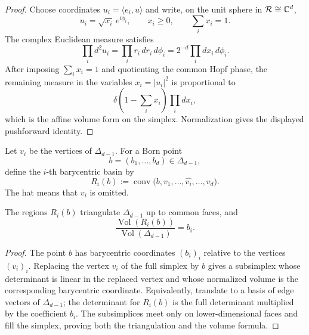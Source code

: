 \documentclass[12pt,a4paper]{article}
\begin{document}
\begin{proof}
Choose coordinates \(u_i=\langle e_i,u\rangle\) and write, on the unit sphere in
\(\mathcal R\cong\mathbb{C}^d\),
\[
        u_i=\sqrt{x_i}\,e^{i\phi_i},
        \qquad x_i\ge0,
        \qquad \sum_i x_i=1 .
\]
The complex Euclidean measure satisfies
\[
        \prod_i d^2u_i
        =
        \prod_i r_i\,dr_i\,d\phi_i
        =
        2^{-d}\prod_i dx_i\,d\phi_i .
\]
After imposing \(\sum_i x_i=1\) and quotienting the common Hopf phase, the remaining
measure in the variables \(x_i=|u_i|^2\) is proportional to
\[
        \delta\!\left(1-\sum_i x_i\right)\prod_i dx_i,
\]
which is the affine volume form on the simplex.  Normalization gives the displayed
pushforward identity.
\end{proof}

\begin{definition}
\label{p4:def:barycentric-actualization-basins}
Let \(v_i\) be the vertices of \(\Delta_{d-1}\).  For a Born point
\[
        b=(b_1,\ldots,b_d)\in\Delta_{d-1},
\]
define the \(i\)-th barycentric basin by
\[
        R_i(b):=\operatorname{conv}\bigl(b,
        v_1,\ldots,\widehat{v_i},\ldots,v_d\bigr).
\]
The hat means that \(v_i\) is omitted.
\end{definition}

\begin{lemma}
\label{p4:lem:barycentric-basin-volume}
The regions \(R_i(b)\) triangulate \(\Delta_{d-1}\) up to common faces, and
\[
        \frac{\operatorname{Vol}(R_i(b))}
             {\operatorname{Vol}(\Delta_{d-1})}
        = b_i .
\]
\end{lemma}

\begin{proof}
The point \(b\) has barycentric coordinates \((b_i)_i\) relative to the vertices
\((v_i)_i\).  Replacing the vertex \(v_i\) of the full simplex by \(b\) gives a
subsimplex whose determinant is linear in the replaced vertex and whose normalized
volume is the corresponding barycentric coordinate.  Equivalently, translate to a
basis of edge vectors of \(\Delta_{d-1}\); the determinant for \(R_i(b)\) is the
full determinant multiplied by the coefficient \(b_i\).  The subsimplices meet only
on lower-dimensional faces and fill the simplex, proving both the triangulation and
the volume formula.
\end{proof}
\end{document}
